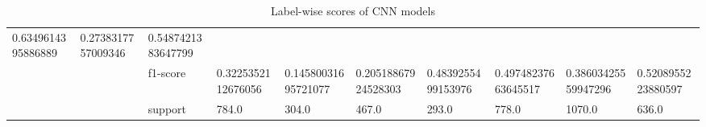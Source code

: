 \begin{table}[h!]
{\begin{tabular}{@{}clllllllll@{}}
  \multicolumn{1}{l|}{0.6349614395886889} &
  \multicolumn{1}{l|}{0.2738317757009346} &
  \multicolumn{1}{l|}{0.5487421383647799} \\ \cmidrule(l){3-10} 
\multicolumn{1}{|c|}{} &
  \multicolumn{1}{l|}{} &
  \multicolumn{1}{l|}{f1-score} &
  \multicolumn{1}{l|}{0.3225352112676056} &
  \multicolumn{1}{l|}{0.14580031695721077} &
  \multicolumn{1}{l|}{0.20518867924528303} &
  \multicolumn{1}{l|}{0.4839255499153976} &
  \multicolumn{1}{l|}{0.49748237663645517} &
  \multicolumn{1}{l|}{0.38603425559947296} &
  \multicolumn{1}{l|}{0.5208955223880597} \\ \cmidrule(l){3-10} 
\multicolumn{1}{|c|}{} &
  \multicolumn{1}{l|}{} &
  \multicolumn{1}{l|}{support} &
  \multicolumn{1}{l|}{784.0} &
  \multicolumn{1}{l|}{304.0} &
  \multicolumn{1}{l|}{467.0} &
  \multicolumn{1}{l|}{293.0} &
  \multicolumn{1}{l|}{778.0} &
  \multicolumn{1}{l|}{1070.0} &
  \multicolumn{1}{l|}{636.0} \\ \bottomrule
\end{tabular}%
}
\caption{Label-wise scores of CNN models}
\label{tab:Label-wise-CNN}
\end{table}

